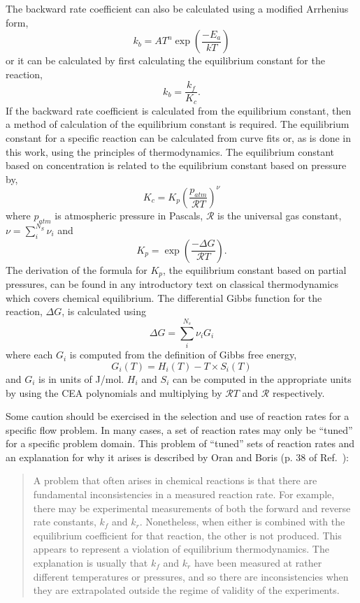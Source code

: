 \medskip
The backward rate coefficient can also be calculated using a modified
Arrhenius form,
\begin{equation}
k_b = A T^{n} \exp{\left(\frac{-E_a}{kT}\right)}
\end{equation}
or it can be calculated by first calculating the equilibrium constant
for the reaction,
\begin{equation}
k_b = \frac{k_f}{K_{c}}.
\end{equation}
%
If the backward rate coefficient is calculated from the equilibrium constant,
then a method of calculation of the equilibrium constant is required.
The equilibrium constant for a specific reaction can be calculated from curve fits or, as is done in this work,
using the principles of thermodynamics.
The equilibrium constant based on concentration is related to the equilibrium constant
based on pressure by,
\begin{equation}
K_c = K_p \left( \frac{p_{atm}}{\mathcal{R}T} \right)^{\nu}
\end{equation}
where $p_{atm}$ is atmospheric pressure in Pascals, $\mathcal{R}$ is the universal
gas constant, $\nu = \sum_i^{N_S} \nu_i$ and
\begin{equation}
K_p = \exp{\left( \frac{-\Delta G}{\mathcal{R}T} \right) }.
\end{equation}
The derivation of the formula for $K_p$, the equilibrium constant based on partial pressures,
can be found in any introductory text on classical thermodynamics which covers chemical equilibrium.
The differential Gibbs function for the reaction, $\Delta G$, is calculated using
\begin{equation}
\Delta G = \sum_i^{N_s} \nu_i G_i
\end{equation}
where each $G_i$ is computed from the definition of Gibbs free energy,
\begin{equation}
G_i(T) = H_i(T) - T \times S_i(T)
\end{equation}
and $G_i$ is in units of J/mol.
$H_i$ and $S_i$ can be computed in the appropriate units
by using the CEA polynomials and multiplying by $\mathcal{R}T$ and
$\mathcal{R}$ respectively.

\medskip
Some caution should be exercised in the selection and use of reaction rates for a specific flow problem.
In many cases, a set of reaction rates may only be ``tuned'' for a specific problem domain.
This problem of ``tuned'' sets of reaction rates and an explanation for why it arises
is described by Oran and Boris (p. 38 of Ref.~\cite{oran_boris_01}):
\begin{quote}
 A problem that often arises in chemical reactions is that there are fundamental inconsistencies
 in a measured reaction rate.
 For example, there may be experimental measurements of both the forward and reverse rate constants,
 $k_f$ and $k_r$.
 Nonetheless, when either is combined with the equilibrium coefficient for that reaction, the other is not
 produced.
 This appears to represent a violation of equilibrium thermodynamics.
 The explanation is usually that $k_f$ and $k_r$ have been measured at rather different temperatures or
 pressures, and so there are inconsistencies when they are extrapolated outside the regime of validity of
 the experiments.
\end{quote}



